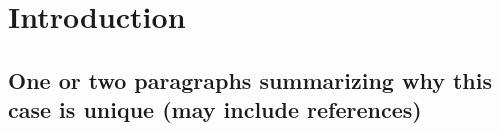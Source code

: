 \section{Introduction}

\subsection{One or two paragraphs summarizing why this case is unique (may include references)}

\cite{wajuihian2021gender}
